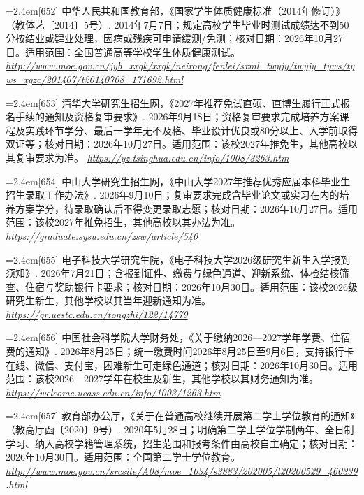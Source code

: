 \par\noindent\hangindent=2.4em\label{src:S0798}{\color{cAccent}[652]} 中华人民共和国教育部，《国家学生体质健康标准（2014年修订）》（教体艺〔2014〕5号）. 2014年7月7日；规定高校学生毕业时测试成绩达不到50分按结业或肄业处理，因病或残疾可申请缓测/免测；核对日期：2026年10月27日。适用范围：全国普通高等学校学生体质健康测试。 \textit{\url{http://www.moe.gov.cn/jyb_xxgk/xxgk/neirong/fenlei/sxml_twyjy/twyjy_tyws/tyws_xgzc/201407/t20140708_171692.html}}\par
\par\noindent\hangindent=2.4em\label{src:S0799}{\color{cAccent}[653]} 清华大学研究生招生网，《2027年推荐免试直硕、直博生履行正式报名手续的通知及资格复审要求》. 2026年9月18日；资格复审要求完成培养方案课程及实践环节学分、最后一学年无不及格、毕业设计优良或80分以上、入学前取得双证等；核对日期：2026年10月27日。适用范围：该校2027年推免生，其他高校以其复审要求为准。 \textit{\url{https://yz.tsinghua.edu.cn/info/1008/3263.htm}}\par
\par\noindent\hangindent=2.4em\label{src:S0800}{\color{cAccent}[654]} 中山大学研究生招生网，《中山大学2027年推荐优秀应届本科毕业生招生录取工作办法》. 2026年9月10日；复审要求完成含毕业论文或实习在内的培养方案学分，待录取确认后不得变更录取志愿；核对日期：2026年10月27日。适用范围：该校2027年推免招生，其他高校以其办法为准。 \textit{\url{https://graduate.sysu.edu.cn/zsw/article/540}}\par
\par\noindent\hangindent=2.4em\label{src:S0801}{\color{cAccent}[655]} 电子科技大学研究生院，《电子科技大学2026级研究生新生入学报到须知》. 2026年7月21日；含报到证件、缴费与绿色通道、迎新系统、体检结核筛查、住宿与奖助银行卡要求；核对日期：2026年10月30日。适用范围：该校2026级研究生新生，其他学校以其当年迎新通知为准。 \textit{\url{https://gr.uestc.edu.cn/tongzhi/122/14779}}\par
\par\noindent\hangindent=2.4em\label{src:S0802}{\color{cAccent}[656]} 中国社会科学院大学财务处，《关于缴纳2026—2027学年学费、住宿费的通知》. 2026年8月25日；统一缴费时间2026年8月25日至9月6日，支持银行卡在线、微信、支付宝，困难新生可走绿色通道；核对日期：2026年10月30日。适用范围：该校2026—2027学年在校生及新生，其他学校以其财务通知为准。 \textit{\url{https://welcome.ucass.edu.cn/info/1003/1263.htm}}\par
\par\noindent\hangindent=2.4em\label{src:S0803}{\color{cAccent}[657]} 教育部办公厅，《关于在普通高校继续开展第二学士学位教育的通知》（教高厅函〔2020〕9号）. 2020年5月28日；明确第二学士学位学制两年、全日制学习、纳入高校学籍管理系统，招生范围和报考条件由高校自主确定；核对日期：2026年10月30日。适用范围：全国第二学士学位教育。 \textit{\url{http://www.moe.gov.cn/srcsite/A08/moe_1034/s3883/202005/t20200529_460339.html}}\par
